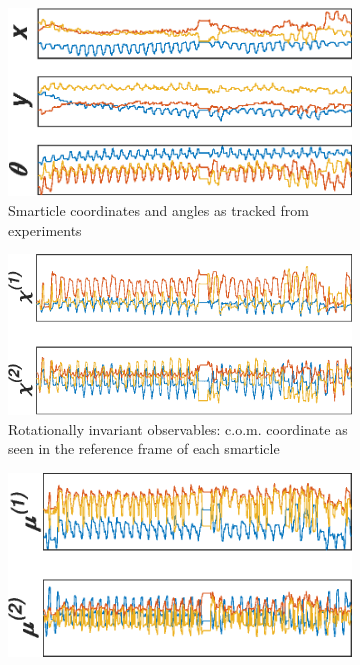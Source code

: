 \documentclass[11pt]{article}
\renewcommand{\=}[1]{\stackrel{#1}{=}} %
\renewcommand{\(}{\left (}
\renewcommand{\)}{\right  )}
\renewcommand{\[}{\left [}
\renewcommand{\]}{\right ]}
\newcommand{\<}{\left <}
\renewcommand{\>}{\right >}
\theoremstyle{definition}
\theoremstyle{remark}
\begin{document}
\begin{figure} 
	\begin{subfigure}[t]{0.4\textwidth}
		\includegraphics[width=1\textwidth]{crdDat.eps}
		\caption{Smarticle coordinates and angles as tracked from experiments \label{fig:crdDat}}
	\end{subfigure}
	\begin{subfigure}[t]{0.4\textwidth}
		\includegraphics[width=1\textwidth]{relDat.eps}
		\caption{Rotationally invariant observables: c.o.m. coordinate as seen in the reference frame of each smarticle \label{fig:relDat}}
	\end{subfigure}
	\begin{subfigure}[t]{0.4\textwidth}
		\includegraphics[width=1\textwidth]{piDat.eps}

\end{subfigure}
\end{figure}
\end{document}

